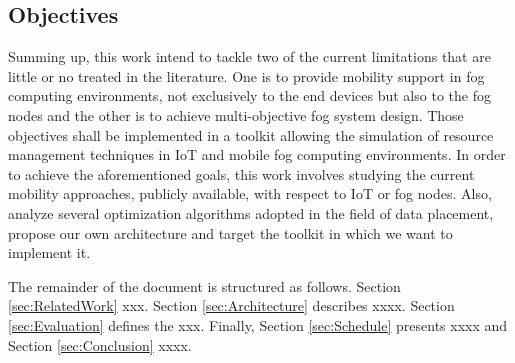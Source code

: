 \subsection{Objectives}\label{subsec:Objectives}
\noindent\tab Summing up, this work intend to tackle two of the current limitations that are little or no treated in the literature. One is to provide mobility support in fog computing environments, not exclusively to the end devices but also to the fog nodes and the other is to achieve multi-objective fog system design. Those objectives shall be implemented in a toolkit allowing the simulation of resource management techniques in IoT and mobile fog computing environments. In order to achieve the aforementioned goals, this work involves studying the current mobility approaches, publicly available, with respect to IoT or fog nodes. Also, analyze several optimization algorithms adopted in the field of data placement, propose our own architecture and target the toolkit in which we want to implement it.


\noindent\tab The remainder of the document is structured as follows. Section
\ref{sec:RelatedWork} xxx. Section \ref{sec:Architecture} describes xxxx.
Section \ref{sec:Evaluation} defines the xxx. Finally, Section
\ref{sec:Schedule} presents xxxx and Section \ref{sec:Conclusion} xxxx.